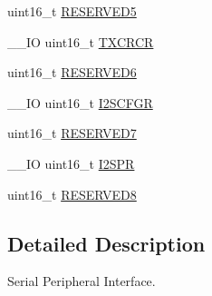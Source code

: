 \begin{DoxyCompactItemize}
uint16\-\_\-t \hyperlink{struct_s_p_i___type_def_abd36010ac282682d1f3c641b183b1b6f}{R\-E\-S\-E\-R\-V\-E\-D5}
\item 
\-\_\-\-\_\-\-I\-O uint16\-\_\-t \hyperlink{struct_s_p_i___type_def_a0238d40f977d03709c97033b8379f98f}{T\-X\-C\-R\-C\-R}
\item 
uint16\-\_\-t \hyperlink{struct_s_p_i___type_def_aab502dde158ab7da8e7823d1f8a06edb}{R\-E\-S\-E\-R\-V\-E\-D6}
\item 
\-\_\-\-\_\-\-I\-O uint16\-\_\-t \hyperlink{struct_s_p_i___type_def_acb40abca5ca4cd2b2855adf2186effe8}{I2\-S\-C\-F\-G\-R}
\item 
uint16\-\_\-t \hyperlink{struct_s_p_i___type_def_ab1820c97e368d349f5f4121f015d9fab}{R\-E\-S\-E\-R\-V\-E\-D7}
\item 
\-\_\-\-\_\-\-I\-O uint16\-\_\-t \hyperlink{struct_s_p_i___type_def_a02ce1ece243cc4ce1d66ebeca247fee1}{I2\-S\-P\-R}
\item 
uint16\-\_\-t \hyperlink{struct_s_p_i___type_def_afc22764fbf9ee7ce28174d65d0260f18}{R\-E\-S\-E\-R\-V\-E\-D8}
\end{DoxyCompactItemize}


\subsection{Detailed Description}
Serial Peripheral Interface. 

